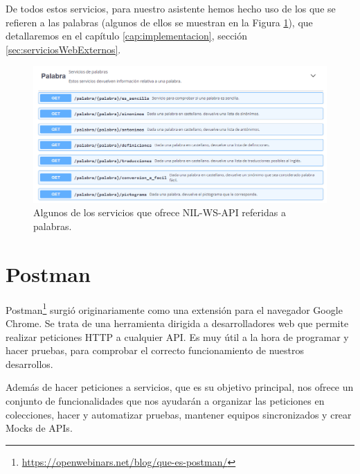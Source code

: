De todos estos servicios, para nuestro asistente hemos hecho uso de los que se refieren a las palabras (algunos de ellos se muestran en la Figura \ref{fig:apiNILWS}), que detallaremos en el capítulo \ref{cap:implementacion}, sección \ref{sec:serviciosWebExternos}.

	\begin{figure}[h!]
	\centering
	
	
	\includegraphics[scale=0.7]{Imagenes/Figuras/apiNil}
	
	
	\caption{Algunos de los servicios que ofrece NIL-WS-API referidas a palabras.}
	\label{fig:apiNILWS}
\end{figure}
\section{Postman}\label{sec:postman}

Postman\footnote{\href{https://openwebinars.net/blog/que-es-postman/}{https://openwebinars.net/blog/que-es-postman/}} surgió originariamente como una extensión para el navegador Google Chrome. Se trata de una herramienta dirigida a desarrolladores web que permite realizar peticiones HTTP a cualquier API. Es muy útil a la hora de programar y hacer pruebas, para comprobar el correcto funcionamiento de nuestros desarrollos.

Además de hacer peticiones a servicios, que es su objetivo principal, nos ofrece un conjunto de funcionalidades que nos ayudarán a organizar las peticiones en colecciones, hacer y automatizar pruebas, mantener equipos sincronizados y crear Mocks de APIs.

